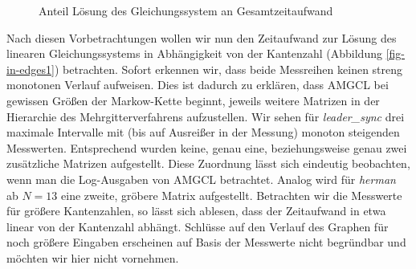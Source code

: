 \documentclass[a4paper]{article}
\newcommand{\mc}{Markow-Kette}
\theoremstyle{nonumberplain}
\begin{document}
	\begin{figure}
		\caption{Anteil Lösung des Gleichungssystem an Gesamtzeitaufwand}
		\label{fig-percentage}
		\centering
	\end{figure}
	
	
	Nach diesen Vorbetrachtungen wollen wir nun den Zeitaufwand zur Lösung des linearen Gleichungssystems in Abhängigkeit von der Kantenzahl (Abbildung \ref{fig-in-edges1})  betrachten. Sofort erkennen wir, dass beide Messreihen keinen streng monotonen Verlauf aufweisen. Dies ist dadurch zu erklären, dass AMGCL bei gewissen Größen der \mc{} beginnt, jeweils weitere Matrizen in der Hierarchie des Mehrgitterverfahrens aufzustellen. Wir sehen für \textit{leader\_sync} drei maximale Intervalle mit (bis auf Ausreißer in der Messung) monoton steigenden Messwerten. Entsprechend wurden keine, genau eine, beziehungsweise genau zwei zusätzliche Matrizen aufgestellt. Diese Zuordnung lässt sich eindeutig beobachten, wenn man die Log-Ausgaben von AMGCL betrachtet. Analog wird für \textit{herman} ab $N=13$ eine zweite, gröbere Matrix aufgestellt. Betrachten wir die Messwerte für größere Kantenzahlen, so lässt sich ablesen, dass der Zeitaufwand in etwa linear von der Kantenzahl abhängt. Schlüsse auf den Verlauf des Graphen für noch größere Eingaben erscheinen auf Basis der Messwerte nicht begründbar und möchten wir hier nicht vornehmen.
	
\end{document}
